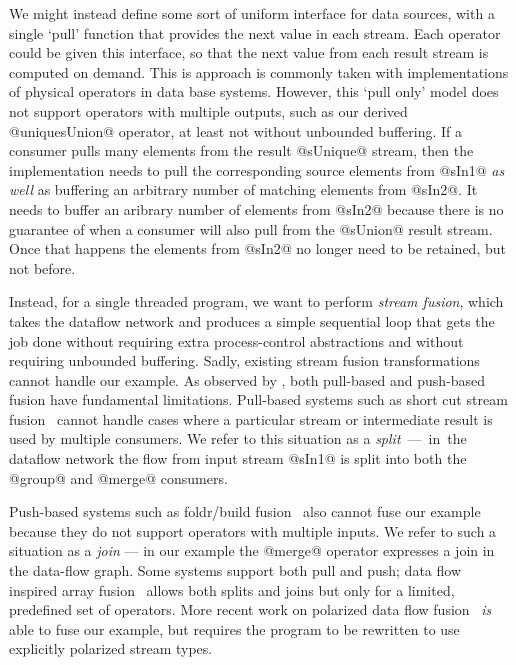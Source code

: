 We might instead define some sort of uniform interface for data sources, with a single `pull' function that provides the next value in each stream. Each operator could be given this interface, so that the next value from each result stream is computed on demand. This is approach is commonly taken with implementations of physical operators in data base systems. However, this `pull only' model does not support operators with multiple outputs, such as our derived @uniquesUnion@ operator, at least not without unbounded buffering. If a consumer pulls many elements from the result @sUnique@ stream, then the implementation needs to pull the corresponding source elements from @sIn1@ \emph{as well} as buffering an arbitrary number of matching elements from @sIn2@. It needs to buffer an aribrary number of elements from @sIn2@ because there is no guarantee of when a consumer will also pull from the @sUnion@ result stream. Once that happens the elements from @sIn2@ no longer need to be retained, but not before.

Instead, for a single threaded program, we want to perform \emph{stream fusion}, which takes the dataflow network and produces a simple sequential loop that gets the job done without requiring extra process-control abstractions and without requiring unbounded buffering. Sadly, existing stream fusion transformations cannot handle our example. As observed by \citet{kay2009you}, both pull-based and push-based fusion have fundamental limitations. Pull-based systems such as short cut stream fusion~\cite{coutts2007stream} cannot handle cases where a particular stream or intermediate result is used by multiple consumers. We refer to this situation as a \mbox{\emph{split} --- in the} dataflow network the flow from input stream @sIn1@ is split into both the @group@ and @merge@ consumers. 


Push-based systems such as foldr/build fusion~\cite{gill1993short} also cannot fuse our example because they do not support operators with multiple inputs. We refer to such a situation as a \emph{join} --- in our example the @merge@ operator expresses a join in the data-flow graph. Some systems support both pull and push; data flow inspired array fusion~\cite{lippmeier2013data} allows both splits and joins but only for a limited, predefined set of operators. More recent work on polarized data flow fusion~\cite{lippmeier2016polarized} \emph{is} able to fuse our example, but requires the program to be rewritten to use explicitly polarized stream types. 

